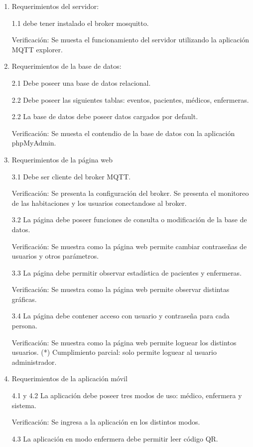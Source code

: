 \begin{enumerate}
\item Requerimientos del servidor: 

1.1 debe tener instalado el broker mosquitto.

Verificación: Se muesta el funcionamiento del servidor utilizando la aplicación MQTT explorer.

\item Requerimientos de la base de datos: 

2.1 Debe poseer una base de datos relacional. 

2.2 Debe poseer las siguientes tablas: eventos, pacientes, médicos, enfermeras. 

2.2 La base de datos debe poseer datos cargados por default.

Verificación: Se muesta el contendio de la base de datos con la aplicación phpMyAdmin.

\item Requerimientos de la página web 

3.1 Debe ser cliente del broker MQTT. 

Verificación: Se presenta la configuración del broker. Se presenta el monitoreo de las habitaciones y los usuarios conectandose al broker.

3.2 La página debe poseer funciones de consulta o modificación de la base de datos.

Verificación: Se muestra como la página web permite cambiar contraseñas de usuarios y otros parámetros.

3.3 La página debe permitir observar estadística de pacientes y enfermeras.

Verificación: Se muestra como la página web permite observar distintas gráficas.

3.4 La página debe contener acceso con usuario y contraseña para cada persona.


Verificación: Se muestra como la página web permite loguear los distintos usuarios.
(*) Cumplimiento parcial: solo permite loguear al usuario administrador.

\item Requerimientos de la aplicación móvil

4.1 y 4.2 La aplicación debe poseer tres modos de uso: médico, enfermera y sistema. 

Verificación: Se ingresa a la aplicación en los distintos modos.

4.3 La aplicación en modo enfermera debe permitir leer código QR.


\end{enumerate}
